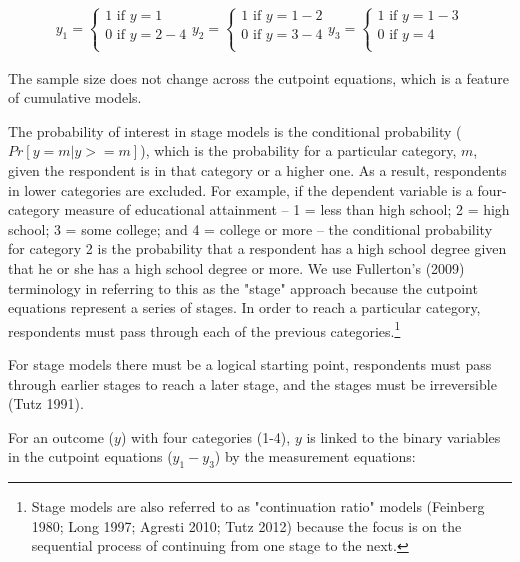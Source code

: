 \begin{eqnarray}
	y_{1} =
	\begin{cases}
	1 \text{ if } y = 1 \nonumber \\
	0 \text{ if } y = 2-4 \nonumber \\
\end{cases}
	y_{2} =
	\begin{cases}
	1 \text{ if } y = 1-2 \nonumber \\
	0 \text{ if } y = 3-4 \nonumber \\
\end{cases}
	y_{3} =
	\begin{cases}
	1 \text{ if } y = 1-3 \nonumber \\
	0 \text{ if } y = 4 \nonumber \\
\end{cases}
\end{eqnarray}

The sample size does not change across the cutpoint equations, which is a feature of cumulative models.

The probability of interest in stage models is the conditional probability ($Pr[ y = m | y >= m]$), which is the probability for a particular category, $m$, given the respondent is in that category or a higher one. As a result, respondents in lower categories are excluded. For example, if the dependent variable is a four-category measure of educational attainment -- 1 = less than high school; 2 = high school; 3 = some college; and 4 = college or more -- the conditional probability for category 2 is the probability that a respondent has a high school degree given that he or she has a high school degree or more. We use Fullerton's (2009) terminology in referring to this as the "stage" approach because the cutpoint equations represent a series of stages. In order to reach a particular category, respondents must pass through each of the previous categories.\footnote{Stage models are also referred to as "continuation ratio" models (Feinberg 1980; Long 1997; Agresti 2010; Tutz 2012) because the focus is on the sequential process of continuing from one stage to the next. }

For stage models there must be a logical starting point, respondents must pass through earlier stages to reach a later stage, and the stages must be irreversible (Tutz 1991).

For an outcome ($y$) with four categories (1-4), $y$ is linked to the binary variables in the cutpoint equations ($y_{1} - y_{3}$) by the measurement equations:

